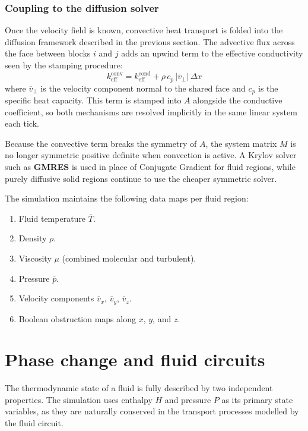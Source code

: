 \documentclass{report}
\begin{document}
\subsubsection*{Coupling to the diffusion solver}

Once the velocity field is known, convective heat transport is folded into the
diffusion framework described in the previous section. The advective flux across the
face between blocks $i$ and $j$ adds an upwind term to the effective conductivity
seen by the stamping procedure:
\[
k_{\text{eff}}^{\text{conv}} = k_{\text{eff}}^{\text{cond}} + \rho\, c_p\, |\overline{v}_\perp|\, \Delta x
\]
where $\overline{v}_\perp$ is the velocity component normal to the shared face and
$c_p$ is the specific heat capacity. This term is stamped into $A$ alongside the
conductive coefficient, so both mechanisms are resolved implicitly in the same
linear system each tick.

Because the convective term breaks the symmetry of $A$, the system matrix $M$ is no
longer symmetric positive definite when convection is active. A Krylov solver such as
\textbf{GMRES} is used in place of Conjugate Gradient for fluid regions, while purely
diffusive solid regions continue to use the cheaper symmetric solver.

The simulation maintains the following data maps per fluid region:
\begin{enumerate}
    \item Fluid temperature $\overline{T}$.
    \item Density $\rho$.
    \item Viscosity $\mu$ (combined molecular and turbulent).
    \item Pressure $\overline{p}$.
    \item Velocity components $\overline{v}_x$, $\overline{v}_y$, $\overline{v}_z$.
    \item Boolean obstruction maps along $x$, $y$, and $z$.
\end{enumerate}

\section{Phase change and fluid circuits}

The thermodynamic state of a fluid is fully described by two independent properties.
The simulation uses enthalpy $H$ and pressure $P$ as its primary state variables,
as they are naturally conserved in the transport processes modelled by the fluid circuit.
\end{document}
